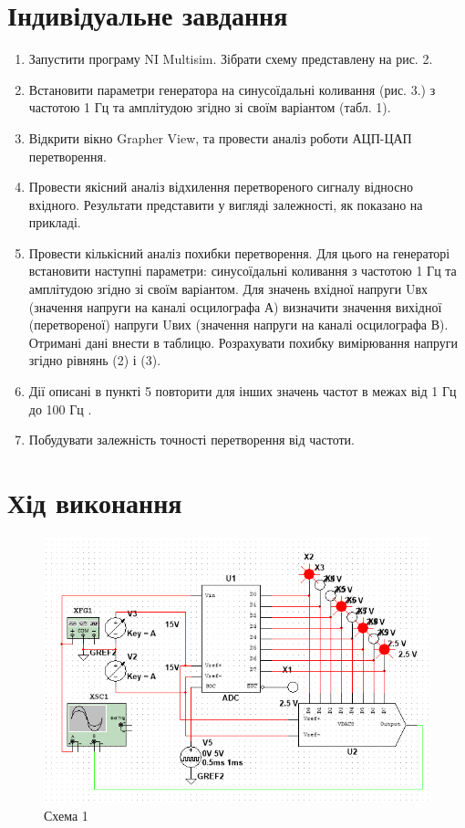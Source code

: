 \documentclass{article}
\begin{document}
\begin{normalsize}
	\section*{Індивідуальне завдання}
	\begin{enumerate}
		\item Запустити програму NI Multisim.  Зібрати схему представлену на рис. 2.
		\item Встановити параметри генератора на синусоїдальні коливання (рис. 3.) з частотою 1 Гц та амплітудою згідно зі своїм варіантом (табл. 1).
		
		\item Відкрити вікно Grapher View, та провести аналіз роботи АЦП-ЦАП перетворення. 
		\item Провести якісний аналіз відхилення перетвореного сигналу відносно вхідного. Результати представити у вигляді залежності, як показано на прикладі.
		\item Провести кількісний аналіз похибки перетворення. Для цього на генераторі встановити наступні параметри: синусоїдальні коливання з частотою 1 Гц та амплітудою згідно зі своїм варіантом. Для значень вхідної напруги Uвх (значення напруги на каналі осцилографа А) визначити значення вихідної (перетвореної) напруги Uвих (значення напруги на каналі осцилографа В). Отримані дані внести в таблицю. Розрахувати похибку вимірювання напруги згідно рівнянь (2) і (3).
		\item Дії описані в пункті 5 повторити для інших значень частот в межах від 1 Гц до 100 Гц . 
		\item Побудувати залежність точності перетворення від частоти.
		
	\end{enumerate}

	\section*{Хід виконання}
	
	\begin{figure}[H]
		\centering
		\includegraphics[width=\textwidth]{1}
		\caption{Схема 1}
	\end{figure}


\end{normalsize}
\end{document}
